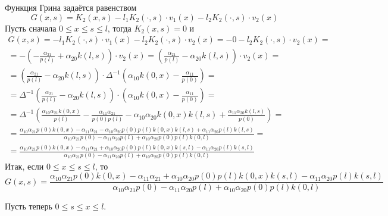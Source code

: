 \documentclass[a4paper,12pt]{article} %
\begin{document}
Функция Грина задаётся равенством
\begin{equation}
	G(x,s) = K_2(x,s) - l_1 K_2(\cdot, s) \cdot v_1(x) - l_2 K_2(\cdot, s) \cdot v_2(x)
\end{equation}
Пусть сначала $0 \leq x\leq s \leq l$, тогда $K_2(x,s) = 0$ и
\begin{multline}
	G(x,s)
	=
	- l_1 K_2(\cdot, s) \cdot v_1(x) - l_2 K_2(\cdot, s) \cdot v_2(x)
	=
	- 0 - l_2 K_2(\cdot, s) \cdot v_2(x)
	=
	\\=
	- \left( -\frac{\alpha_{21}}{p(l)} + \alpha_{20} k(l,s) \right) \cdot v_2(x)
	=
	\left( \frac{\alpha_{21}}{p(l)} - \alpha_{20} k(l,s) \right) \cdot v_2(x)
	=
	\\=
	\left( \frac{\alpha_{21}}{p(l)} - \alpha_{20} k(l,s) \right) \cdot
	\Delta^{-1}
	\left(
		\alpha_{10} k(0, x) - \frac{\alpha_{11}}{p(0)}
	\right)
	=
	\\=
	\Delta^{-1}
	\left(
		\frac{\alpha_{21}}{p(l)} - \alpha_{20} k(l,s)
	\right) \cdot \left(
		\alpha_{10} k(0, x) - \frac{\alpha_{11}}{p(0)}
	\right)
	=
	\\=
	\Delta^{-1}
	\left(
		 \frac{\alpha_{10}\alpha_{21} k(0, x)}{p(l)}
		-\frac{\alpha_{11}\alpha_{21}}{p(0)p(l)}
		-\alpha_{10} \alpha_{20} k(0, x) k(l,s)
		+\frac{\alpha_{11}\alpha_{20} k(l,s)}{p(0)}
	\right)
	=
	\\=
	\frac{
		  \alpha_{10} \alpha_{21} p(0) k(0, x)
		- \alpha_{11} \alpha_{21}
		- \alpha_{10} \alpha_{20} p(0) p(l) k(0, x) k(l, s)
		+ \alpha_{11} \alpha_{20} p(l) k(l,s)
	}{
		\alpha_{10}\alpha_{21}p(0)  - \alpha_{11}\alpha_{20}p(l) + \alpha_{10}\alpha_{20} p(0) p(l) k(0,l)
	}
	=
	\\=
	\frac{
		  \alpha_{10} \alpha_{21} p(0) k(0, x)
		- \alpha_{11} \alpha_{21}
		+ \alpha_{10} \alpha_{20} p(0) p(l) k(0, x) k(s, l)
		- \alpha_{11} \alpha_{20} p(l) k(s,l)
	}{
		\alpha_{10}\alpha_{21}p(0)  - \alpha_{11}\alpha_{20}p(l) + \alpha_{10}\alpha_{20} p(0) p(l) k(0,l)
	}
\end{multline}
Итак, если $0 \leq x\leq s \leq l$, то
\begin{equation}\label{Gxs_x_leq_s}
	G(x,s)
	=
	\frac{
		  \alpha_{10} \alpha_{21} p(0) k(0, x)
		- \alpha_{11} \alpha_{21}
		+ \alpha_{10} \alpha_{20} p(0) p(l) k(0, x) k(s, l)
		- \alpha_{11} \alpha_{20} p(l) k(s,l)
	}{
		\alpha_{10}\alpha_{21}p(0)  - \alpha_{11}\alpha_{20}p(l) + \alpha_{10}\alpha_{20} p(0) p(l) k(0,l)
	}
\end{equation}

Пусть теперь $0 \leq s\leq x \leq l$.
\end{document}
